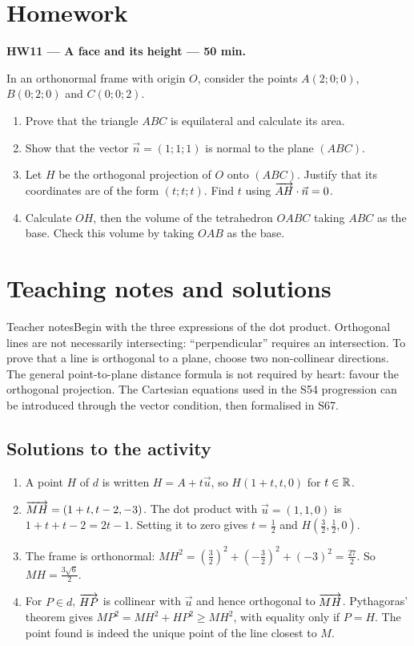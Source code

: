 \section{Homework}\textbf{HW11 --- A face and its height --- 50 min.}\par In an orthonormal frame with origin $O$, consider the points $A(2;0;0)$, $B(0;2;0)$ and $C(0;0;2)$.
\begin{enumerate}\item Prove that the triangle $ABC$ is equilateral and calculate its area.
\item Show that the vector $\vec n=(1;1;1)$ is normal to the plane $(ABC)$.
\item Let $H$ be the orthogonal projection of $O$ onto $(ABC)$. Justify that its coordinates are of the form $(t;t;t)$. Find $t$ using $\overrightarrow{AH}\cdot\vec n=0$.
\item Calculate $OH$, then the volume of the tetrahedron $OABC$ taking $ABC$ as the base. Check this volume by taking $OAB$ as the base.\end{enumerate}

\ifprof\clearpage\section{Teaching notes and solutions}\begin{profbox}{Teacher notes}Begin with the three expressions of the dot product. Orthogonal lines are not necessarily intersecting: ``perpendicular'' requires an intersection. To prove that a line is orthogonal to a plane, choose two non-collinear directions. The general point-to-plane distance formula is not required by heart: favour the orthogonal projection. The Cartesian equations used in the S54 progression can be introduced through the vector condition, then formalised in S67.\end{profbox}

\subsection{Solutions to the activity}\begin{enumerate}
\item A point $H$ of $d$ is written $H=A+t\vec u$, so $H(1+t,t,0)$ for $t\in\mathbb R$.
\item $\overrightarrow{MH}=(1+t,t-2,-3)$. The dot product with $\vec u=(1,1,0)$ is $1+t+t-2=2t-1$. Setting it to zero gives $t=\frac{1}{2}$ and $H(\frac{3}{2},\frac{1}{2},0)$.
\item The frame is orthonormal: $MH^2=(\frac{3}{2})^2+(-\frac{3}{2})^2+(-3)^2=\frac{27}{2}$. So $MH=\frac{3\sqrt{6}}{2}$.
\item For $P\in d$, $\overrightarrow{HP}$ is collinear with $\vec u$ and hence orthogonal to $\overrightarrow{MH}$. Pythagoras' theorem gives $MP^2=MH^2+HP^2\ge MH^2$, with equality only if $P=H$. The point found is indeed the unique point of the line closest to $M$.
\end{enumerate}

